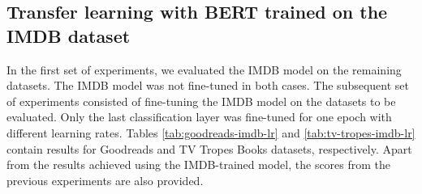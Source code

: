 \documentclass[11pt]{article}
\begin{document}
\subsection{Transfer learning with BERT trained on the IMDB dataset}

In the first set of experiments, we evaluated the IMDB model on the remaining datasets. The IMDB model was not fine-tuned in both cases. The subsequent set of experiments consisted of fine-tuning the IMDB model on the datasets to be evaluated. Only the last classification layer was fine-tuned for one epoch with different learning rates. Tables \ref{tab:goodreads-imdb-lr} and \ref{tab:tv-tropes-imdb-lr} contain results for Goodreads and TV Tropes Books datasets, respectively. Apart from the results achieved using the IMDB-trained model, the scores from the previous experiments are also provided.
 


\end{document}
